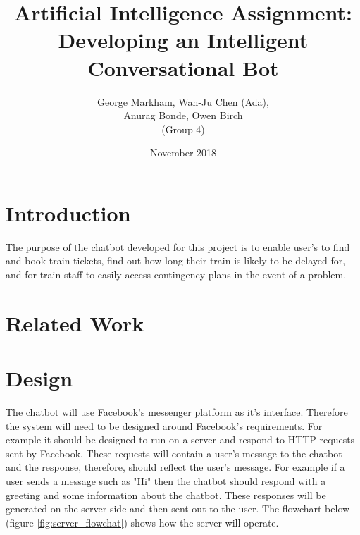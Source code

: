 \documentclass[12pt,a4paper]{article}
\title{Artificial Intelligence Assignment: Developing an Intelligent Conversational Bot}
\author{George Markham, Wan-Ju Chen (Ada), \\ Anurag Bonde, Owen Birch \\ (Group 4)} %
\date{November 2018}
\begin{document}
    \maketitle
    \section{Introduction}
    The purpose of the chatbot developed for this project is to enable user's to find and book train tickets, find out how long their train is likely to be delayed for, and for train staff to easily access contingency plans in the event of a problem.
    \section{Related Work}
    \section{Design}
    The chatbot will use Facebook's messenger platform as it's interface. Therefore the system will need to be designed around Facebook's requirements. For example it should be designed to run on a server and respond to HTTP requests sent by Facebook. These requests will contain a user's message to the chatbot and the response, therefore, should reflect the user's message. For example if a user sends a message such as "Hi" then the chatbot should respond with a greeting and some information about the chatbot. These responses will be generated on the server side and then sent out to the user. The flowchart below (figure \ref{fig:server_flowchat}) shows how the server will operate.
    
\end{document}

